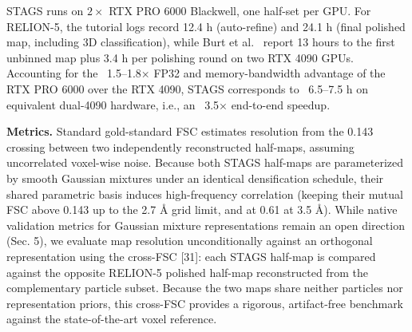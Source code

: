 STAGS runs on $2\times$ RTX PRO 6000 Blackwell, one half-set per GPU. For RELION-5, the tutorial logs record 12.4 h (auto-refine) and 24.1 h (final polished map, including 3D classification), while Burt et al.~\cite{burt2024relion5} report 13 hours to the first unbinned map plus 3.4 h per polishing round on two RTX 4090 GPUs. Accounting for the ~1.5–1.8× FP32 and memory-bandwidth advantage of the RTX PRO 6000 over the RTX 4090, STAGS corresponds to ~6.5–7.5 h on equivalent dual-4090 hardware, i.e., an ~3.5× end-to-end speedup.

\noindent\textbf{Metrics.}
Standard gold-standard FSC estimates resolution from the 0.143 crossing between two independently reconstructed half-maps, assuming uncorrelated voxel-wise noise. Because both STAGS half-maps are parameterized by smooth Gaussian mixtures under an identical densification schedule, their shared parametric basis induces high-frequency correlation (keeping their mutual FSC above 0.143 up to the 2.7 Å grid limit, and at 0.61 at 3.5 Å). While native validation metrics for Gaussian mixture representations remain an open direction (Sec. 5), we evaluate map resolution unconditionally against an orthogonal representation using the cross-FSC [31]: each STAGS half-map is compared against the opposite RELION-5 polished half-map reconstructed from the complementary particle subset. Because the two maps share neither particles nor representation priors, this cross-FSC provides a rigorous, artifact-free benchmark against the state-of-the-art voxel reference.


